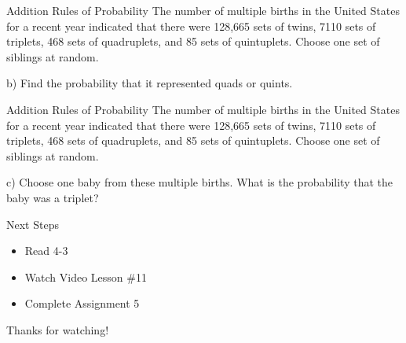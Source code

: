 \documentclass[t, aspectratio=169]{beamer}
\newcommand{\?}{\stackrel{?}{=}}
\begin{document}
	\begin{frame}{Addition Rules of Probability}
		The number of multiple births in the United States for a recent year indicated that there were 128,665 sets of twins, 7110 sets of triplets, 468 sets of quadruplets, and 85 sets of quintuplets. Choose one set of siblings at random.
		
		b) Find the probability that it represented quads or quints.
		\begin{flalign*}
		\end{flalign*}
	\end{frame}

	\begin{frame}{Addition Rules of Probability}
		The number of multiple births in the United States for a recent year indicated that there were 128,665 sets of twins, 7110 sets of triplets, 468 sets of quadruplets, and 85 sets of quintuplets. Choose one set of siblings at random.
		
		c) Choose one baby from these multiple births. What is the probability that the baby was a triplet?
		
		
	\end{frame}

	\begin{frame}{Next Steps}
		\begin{itemize}
			\item Read 4-3
			\item Watch Video Lesson \#11
			\item Complete Assignment 5
		\end{itemize}
	
		\vfill
		
		Thanks for watching!
	\end{frame}
	
\end{document}
